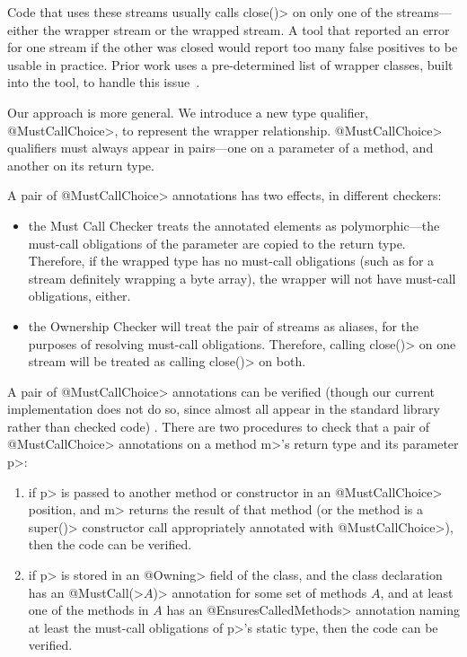 Code that uses these streams usually calls \<close()> on only one
of the streams---either the wrapper stream or the wrapped stream.
A tool that reported an error for one stream if the other was closed
would report too many false positives to be usable in practice.
Prior work uses a pre-determined list of wrapper classes, built into
the tool, to handle this issue~\cite{TorlakC10}. 

Our approach is more general. We introduce a new type qualifier,
\<@MustCallChoice>, to represent the wrapper relationship. \<@MustCallChoice>
qualifiers must always appear in pairs---one on a parameter of a method,
and another on its return type.

A pair of \<@MustCallChoice> annotations has two effects, in different
checkers:
\begin{itemize}
\item the Must Call Checker treats the annotated elements as polymorphic---the
  must-call obligations of the parameter are copied to the return type.
  Therefore, if the wrapped type has no must-call obligations (such as
  for a stream definitely wrapping a byte array), the wrapper will not
  have must-call obligations, either.
\item the Ownership Checker will treat the pair of streams as aliases,
  for the purposes of resolving must-call obligations. Therefore, calling
  \<close()> on one stream will be treated as calling \<close()> on both.
\end{itemize}

A pair of \<@MustCallChoice> annotations can be verified (though our current
implementation does not do so, since almost all appear in the standard
library rather than checked code) . There are two
procedures to check
that a pair of \<@MustCallChoice> annotations on a method \<m>'s return type
and its parameter \<p>:
\begin{enumerate}
\item if \<p> is passed to another method or constructor in an
  \<@MustCallChoice> position, and \<m> returns the result of that method
  (or the method is a \<super()> constructor call appropriately annotated
  with \<@MustCallChoice>), then the code can be verified.
\item if \<p> is stored in an \<@Owning> field of the class, and the
  class declaration has an \<@MustCall(>$A$\<)> annotation for some set
  of methods $A$, and at least one of the methods in $A$ has an
  \<@EnsuresCalledMethods> annotation naming at least the
  must-call obligations of \<p>'s static type, then the code can be verified.
\end{enumerate}

